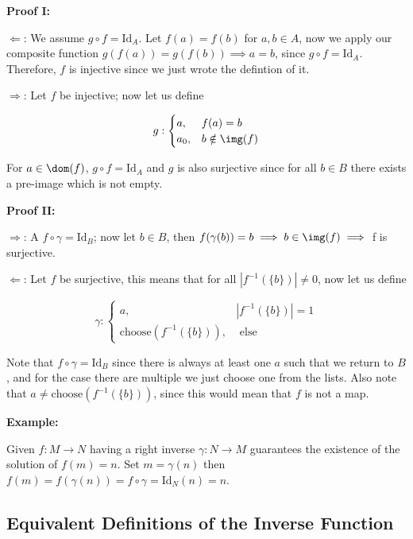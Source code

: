 \textbf{Proof I:}

\(\Leftarrow\): We assume \(g \circ f = \mathrm{Id}_A\). Let \(f(a) = f(b)\) for \(a, b \in A\), now we apply our composite function 
\(g(f(a)) = g(f(b)) \implies a = b\), since \(g \circ f = \mathrm{Id}_A\). Therefore, \(f\) is injective since we just wrote the defintion of it.

\(\Rightarrow\): Let \(f\) be injective; now let us define 

\[
	g: 
	\begin{cases}
		a, & f(a) = b \\ 
		a_0, & b \notin \img(f) 
	\end{cases}
\]

For \(a \in \dom(f)\), \(g \circ f = \mathrm{Id}_A\) and \(g\) is also surjective since for all \(b \in B\) there exists a pre-image which is not empty.

\QED

\textbf{Proof II:}

\(\Rightarrow\): A \(f \circ \gamma = \mathrm{Id}_B\); now let \(b \in B\), then \(f(\gamma(b)) = b \implies b \in \img(f) \implies\) f is 
surjective.

\(\Leftarrow\): Let \(f\) be surjective, this means that for all \(|f^{-1}(\{b\})| \neq 0\), now let us define 

\[
	\gamma:
	\begin{cases}
		a, & |f^{-1}(\{b\})| = 1 \\
		\mathrm{choose}(f^{-1}(\{b\})), & \text{ else }
	\end{cases}
\]


Note that \(f \circ \gamma = \mathrm{Id}_B\) since there is always at least one \(a\) such that we return to \(B\), and for the case there are multiple 
we just choose one from the lists. Also note that \(a \neq \mathrm{choose}(f^{-1}(\{b\}))\), since this would mean that \(f\) is not a map.

\QED

\textbf{Example:}

Given \(f: M \to N\) having a right inverse \(\gamma: N \to M\) guarantees the existence of the solution of \(f(m) = n\). Set \(m = \gamma(n)\) then 
\(f(m) = f(\gamma(n)) = f \circ \gamma = \text{Id}_N (n) = n\).

\subsection{Equivalent Definitions of the Inverse Function}

